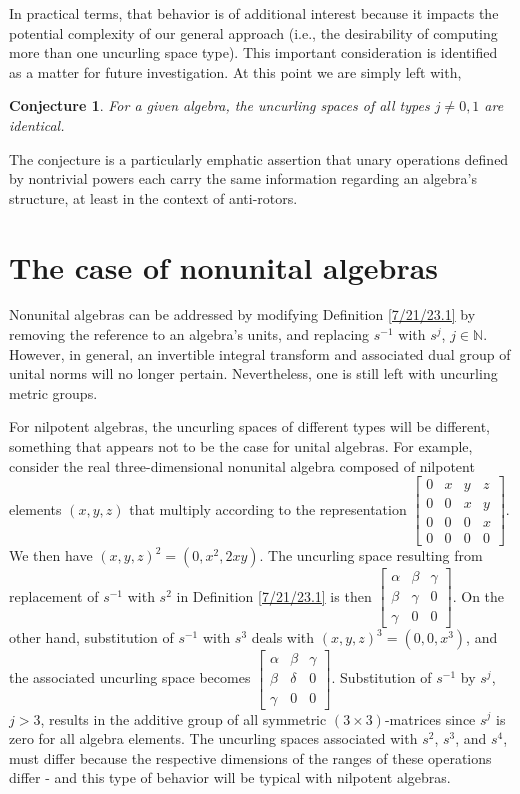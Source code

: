 \documentclass{amsart}
\numberwithin{equation}{section}
\newtheorem*{conjecture}{Conjecture}
\theoremstyle{definition}
\numberwithin{theorem}{section}
\begin{document}
In practical terms, that behavior is of additional interest because it impacts the potential complexity of our general approach (i.e., the desirability of computing more than one uncurling space type).  This important consideration is identified as a matter for future investigation. At this point we are simply left with,
\begin{conjecture} For a given algebra, the uncurling spaces of all types $j\ne 0,1$ are identical. 
\end{conjecture}
\noindent The conjecture is a particularly emphatic assertion that unary operations defined by nontrivial powers each carry the same information regarding an algebra's structure, at least in the context of anti-rotors. 

\vspace{.75cm} 
 
 \section{The case of nonunital algebras} Nonunital algebras can be addressed by modifying Definition \ref{7/21/23.1} by removing the reference to an algebra's units, and replacing $s^{-1}$ with $s^j$, $j \in \mathbb{N}$.   However, in general, an invertible integral transform and associated dual group of unital norms will no longer pertain.  Nevertheless, one is still left with uncurling metric groups.

For nilpotent algebras, the uncurling spaces of different types will be different, something that appears not to be the case for unital algebras.  For example, consider the real three-dimensional nonunital algebra composed of nilpotent elements $(x,y,z)$ that multiply according to the representation
  $ \left[
\begin{array}{ccccc}
0 & x & y & z  \\
0 & 0 & x & y \\
0 & 0 & 0 & x \\
0 & 0 & 0 & 0
\end{array}
\right] $.  We then have $(x,y,z)^2 = (0,x^2, 2xy)$.  The uncurling space resulting from replacement of $s^{-1}$ with  $s^2$ in Definition \ref{7/21/23.1} is then $\left[
\begin{array}{ccccc}
\alpha & \beta & \gamma   \\
\beta & \gamma & 0 \\
\gamma & 0 & 0  
\end{array}
\right] $.  On the other hand, substitution of $s^{-1}$ with $s^3$  deals with $(x,y,z)^3 = (0,0, x^3)$, and the associated uncurling space becomes $\left[
\begin{array}{ccccc}
\alpha & \beta & \gamma   \\
\beta & \delta & 0 \\
\gamma & 0 & 0  
\end{array}
\right] $.  Substitution of $s^{-1}$ by $s^j$, $j>3$, results in the additive group of all symmetric $(3\times 3)$-matrices since $s^j$ is zero for all algebra elements.  The uncurling spaces associated with $s^2$, $s^3$, and $s^4$, must differ because the respective dimensions of the ranges of these operations differ - and this type of behavior will be typical with nilpotent algebras.  
 
\end{document}
